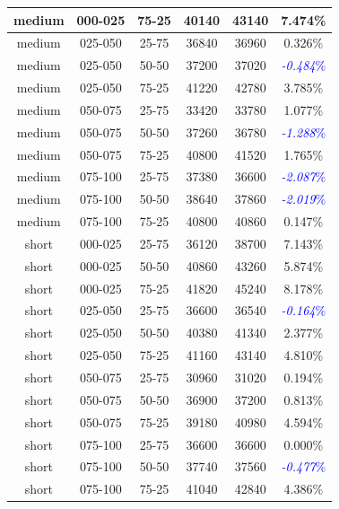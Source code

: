\begin{table}
\begin{center}
\begin{tabular}{|c|c|c|c|c|c|}
\\\hline
medium & 000-025 & 75-25 & 40140 & 43140 & 7.474\%
\\\hline
medium & 025-050 & 25-75 & 36840 & 36960 & 0.326\%
\\\hline
medium & 025-050 & 50-50 & 37200 & 37020 & \textcolor{blue}{\textit{-0.484}\%}
\\\hline
medium & 025-050 & 75-25 & 41220 & 42780 & 3.785\%
\\\hline
medium & 050-075 & 25-75 & 33420 & 33780 & 1.077\%
\\\hline
medium & 050-075 & 50-50 & 37260 & 36780 & \textcolor{blue}{\textit{-1.288}\%}
\\\hline
medium & 050-075 & 75-25 & 40800 & 41520 & 1.765\%
\\\hline
medium & 075-100 & 25-75 & 37380 & 36600 & \textcolor{blue}{\textit{-2.087}\%}
\\\hline
medium & 075-100 & 50-50 & 38640 & 37860 & \textcolor{blue}{\textit{-2.019}\%}
\\\hline
medium & 075-100 & 75-25 & 40800 & 40860 & 0.147\%
\\\hline
short & 000-025 & 25-75 & 36120 & 38700 & 7.143\%
\\\hline
short & 000-025 & 50-50 & 40860 & 43260 & 5.874\%
\\\hline
short & 000-025 & 75-25 & 41820 & 45240 & 8.178\%
\\\hline
short & 025-050 & 25-75 & 36600 & 36540 & \textcolor{blue}{\textit{-0.164}\%}
\\\hline
short & 025-050 & 50-50 & 40380 & 41340 & 2.377\%
\\\hline
short & 025-050 & 75-25 & 41160 & 43140 & 4.810\%
\\\hline
short & 050-075 & 25-75 & 30960 & 31020 & 0.194\%
\\\hline
short & 050-075 & 50-50 & 36900 & 37200 & 0.813\%
\\\hline
short & 050-075 & 75-25 & 39180 & 40980 & 4.594\%
\\\hline
short & 075-100 & 25-75 & 36600 & 36600 & 0.000\%
\\\hline
short & 075-100 & 50-50 & 37740 & 37560 & \textcolor{blue}{\textit{-0.477}\%}
\\\hline
short & 075-100 & 75-25 & 41040 & 42840 & 4.386\%
\\\hline
\end{tabular}

\label{tab:noVMvsPredeploy}
\end{center}
\end{table}

